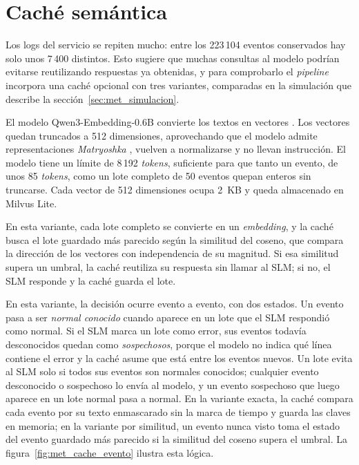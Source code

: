 \section{Caché semántica}\label{sec:met_cache}

Los logs del servicio se repiten mucho: entre los 223\,104 eventos conservados hay solo unos 7\,400 distintos. Esto sugiere que muchas consultas al modelo podrían evitarse reutilizando respuestas ya obtenidas, y para comprobarlo el \textit{pipeline} incorpora una caché opcional con tres variantes, comparadas en la simulación que describe la sección~\ref{sec:met_simulacion}.


El modelo Qwen3-Embedding-0.6B convierte los textos en vectores \cite{zhang2025_qwen3emb}. Los vectores quedan truncados a 512 dimensiones, aprovechando que el modelo admite representaciones \textit{Matryoshka} \cite{kusupati2022_matryoshka}, vuelven a normalizarse y no llevan instrucción. El modelo tiene un límite de 8\,192 \textit{tokens}, suficiente para que tanto un evento, de unos 85 \textit{tokens}, como un lote completo de 50 eventos quepan enteros sin truncarse. Cada vector de 512 dimensiones ocupa 2~KB y queda almacenado en Milvus Lite.


En esta variante, cada lote completo se convierte en un \textit{embedding}, y la caché busca el lote guardado más parecido según la similitud del coseno, que compara la dirección de los vectores con independencia de su magnitud. Si esa similitud supera un umbral, la caché reutiliza su respuesta sin llamar al SLM; si no, el SLM responde y la caché guarda el lote.


En esta variante, la decisión ocurre evento a evento, con dos estados. Un evento pasa a ser \emph{normal conocido} cuando aparece en un lote que el SLM respondió como normal. Si el SLM marca un lote como error, sus eventos todavía desconocidos quedan como \emph{sospechosos}, porque el modelo no indica qué línea contiene el error y la caché asume que está entre los eventos nuevos. Un lote evita al SLM solo si todos sus eventos son normales conocidos; cualquier evento desconocido o sospechoso lo envía al modelo, y un evento sospechoso que luego aparece en un lote normal pasa a normal. En la variante exacta, la caché compara cada evento por su texto enmascarado sin la marca de tiempo y guarda las claves en memoria; en la variante por similitud, un evento nunca visto toma el estado del evento guardado más parecido si la similitud del coseno supera el umbral. La figura~\ref{fig:met_cache_evento} ilustra esta lógica.

